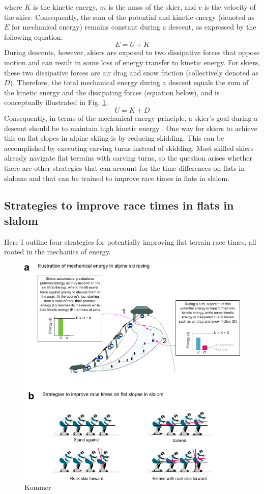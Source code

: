 where $K$ is the kinetic energy, $m$ is the mass of the skier, and $v$ is the velocity of the skier. Consequently, the sum of the potential and kinetic energy  (denoted as $E$ for mechanical energy) remains constant during a descent, as expressed by the following equation:
\[ E = U + K \]
During descents, however, skiers are exposed to two dissipative forces that oppose motion and can result in some loss of energy transfer to kinetic energy. For skiers, these two dissipative forces are air drag and snow friction (collectively denoted as $D$)\cite{supej_differential_2008}. Therefore, the total mechanical energy during a descent equals the sum of the kinetic energy and the dissipating forces (equation below), and is conceptually illustrated in Fig. \ref{fig:energy}.
\[ U = K + D\]
Consequently, in terms of the mechanical energy principle, a skier's goal during a descent should be to maintain high kinetic energy \cite{supej_differential_2008, supej_mechanical_2011, supej_how_2010}. One way for skiers to achieve this on flat slopes in alpine skiing is by reducing skidding\cite{reid_kinematic_2010, reid_turn_2009}. This can be accomplished by executing carving turns instead of skidding. Most skilled skiers already navigate flat terrains with carving turns, so the question arises whether there are other strategies that can account for the time differences on flats in slaloms and that can be trained to improve race times in flats in slalom.  

\subsection{Strategies to improve race times in flats in slalom}
Here I outline four strategies for potentially improving flat terrain race times, all rooted in the mechanics of energy.

\begin{figure}[H]
\centering
\includegraphics{figure_energymechanics.pdf}
\caption{Kommer}
\label{fig:energy}
\end{figure}

